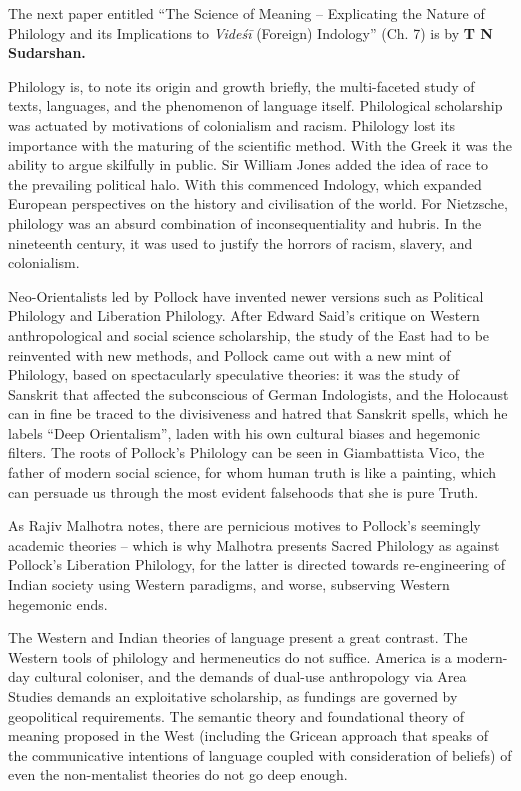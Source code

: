 The next paper entitled “The Science of Meaning – Explicating the Nature of Philology and its Implications to \textit{Videśī} (Foreign) Indology” (Ch. 7) is by \textbf{T N Sudarshan.}

 Philology is, to note its origin and growth briefly, the multi-faceted study of texts, languages, and the phenomenon of language itself. Philological scholarship was actuated by motivations of colonialism and racism. Philology lost its importance with the maturing of the scientific method. With the Greek it was the ability to argue skilfully in public. Sir William Jones added the idea of race to the prevailing political halo. With this commenced Indology, which expanded European perspectives on the history and civilisation of the world. For Nietzsche, philology was an absurd combination of inconsequentiality and hubris. In the nineteenth century, it was used to justify the horrors of racism, slavery, and colonialism. 

Neo-Orientalists led by Pollock have invented newer versions such as Political Philology and Liberation Philology. After Edward Said’s critique on Western anthropological and social science scholarship, the study of the East had to be reinvented with new methods, and Pollock came out with a new mint of Philology, based on spectacularly speculative theories: it was the study of Sanskrit that affected the subconscious of German Indologists, and the Holocaust can in fine be traced to the divisiveness and hatred that Sanskrit spells, which he labels “Deep Orientalism”, laden with his own cultural biases and hegemonic filters. The roots of Pollock’s Philology can be seen in Giambattista Vico, the father of modern social science, for whom human truth is like a painting, which can persuade us through the most evident falsehoods that she is pure Truth. 

As Rajiv Malhotra notes, there are pernicious motives to Pollock’s seemingly academic theories – which is why Malhotra presents Sacred Philology as against Pollock’s Liberation Philology, for the latter is directed towards re-engineering of Indian society using Western paradigms, and worse, subserving Western hegemonic ends.

The Western and Indian theories of language present a great contrast. The Western tools of philology and hermeneutics do not suffice. America is a modern-day cultural coloniser, and the demands of dual-use anthropology via Area Studies demands an exploitative scholarship, as fundings are governed by geopolitical requirements. The semantic theory and foundational theory of meaning proposed in the West (including the Gricean approach that speaks of the communicative intentions of language coupled with consideration of beliefs) of even the non-mentalist theories do not go deep enough.

